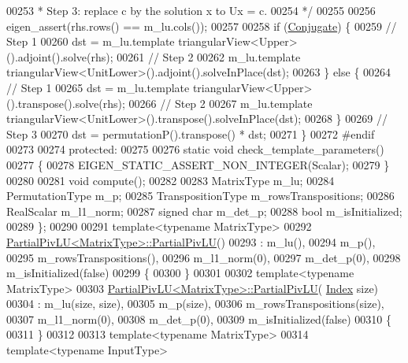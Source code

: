\begin{DoxyCode}
00253 \textcolor{comment}{      * Step 3: replace c by the solution x to Ux = c.}
00254 \textcolor{comment}{      */}
00255 
00256       eigen\_assert(rhs.rows() == m\_lu.cols());
00257 
00258       \textcolor{keywordflow}{if} (\hyperlink{class_eigen_1_1_conjugate}{Conjugate}) \{
00259         \textcolor{comment}{// Step 1}
00260         dst = m\_lu.template triangularView<Upper>().adjoint().solve(rhs);
00261         \textcolor{comment}{// Step 2}
00262         m\_lu.template triangularView<UnitLower>().adjoint().solveInPlace(dst);
00263       \} \textcolor{keywordflow}{else} \{
00264         \textcolor{comment}{// Step 1}
00265         dst = m\_lu.template triangularView<Upper>().transpose().solve(rhs);
00266         \textcolor{comment}{// Step 2}
00267         m\_lu.template triangularView<UnitLower>().transpose().solveInPlace(dst);
00268       \}
00269       \textcolor{comment}{// Step 3}
00270       dst = permutationP().transpose() * dst;
00271     \}
00272 \textcolor{preprocessor}{    #endif}
00273 
00274   \textcolor{keyword}{protected}:
00275 
00276     \textcolor{keyword}{static} \textcolor{keywordtype}{void} check\_template\_parameters()
00277     \{
00278       EIGEN\_STATIC\_ASSERT\_NON\_INTEGER(Scalar);
00279     \}
00280 
00281     \textcolor{keywordtype}{void} compute();
00282 
00283     MatrixType m\_lu;
00284     PermutationType m\_p;
00285     TranspositionType m\_rowsTranspositions;
00286     RealScalar m\_l1\_norm;
00287     \textcolor{keywordtype}{signed} \textcolor{keywordtype}{char} m\_det\_p;
00288     \textcolor{keywordtype}{bool} m\_isInitialized;
00289 \};
00290 
00291 \textcolor{keyword}{template}<\textcolor{keyword}{typename} MatrixType>
00292 \hyperlink{group___l_u___module_a5c04818d354f94a98786d8a44cb709c6}{PartialPivLU<MatrixType>::PartialPivLU}()
00293   : m\_lu(),
00294     m\_p(),
00295     m\_rowsTranspositions(),
00296     m\_l1\_norm(0),
00297     m\_det\_p(0),
00298     m\_isInitialized(\textcolor{keyword}{false})
00299 \{
00300 \}
00301 
00302 \textcolor{keyword}{template}<\textcolor{keyword}{typename} MatrixType>
00303 \hyperlink{group___l_u___module_a5c04818d354f94a98786d8a44cb709c6}{PartialPivLU<MatrixType>::PartialPivLU}(
      \hyperlink{group___core___module_a554f30542cc2316add4b1ea0a492ff02}{Index} size)
00304   : m\_lu(size, size),
00305     m\_p(size),
00306     m\_rowsTranspositions(size),
00307     m\_l1\_norm(0),
00308     m\_det\_p(0),
00309     m\_isInitialized(\textcolor{keyword}{false})
00310 \{
00311 \}
00312 
00313 \textcolor{keyword}{template}<\textcolor{keyword}{typename} MatrixType>
00314 \textcolor{keyword}{template}<\textcolor{keyword}{typename} InputType>

\end{DoxyCode}
